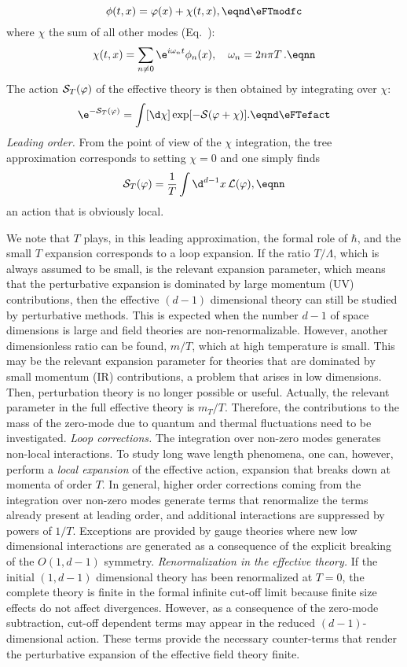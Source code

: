 $$\phi( t,x)=\varphi(x)+\chi(t,x), \eqnd\eFTmodfc $$
where  $\chi$ the
sum of all other modes (Eq.~\emodexp):
$$\chi(t,x)=\sum_{n\ne 0}\e^{i\omega_n t}\phi_n
(x), \quad \omega_n=2n\pi T\,. \eqnn $$
The action ${\cal S}_T(\varphi) $ of the effective theory is then obtained by integrating over $\chi$:
$$\e^{-{\cal S}_T(\varphi)}=\int[\d\chi]\exp[-{\cal S}
(\varphi +\chi)]. \eqnd\eFTefact $$
\smallskip
{\it Leading order.} From the point of view of the $\chi$
integration, the tree approximation corresponds to setting
$\chi=0$ and one simply finds
$${\cal S}_T(\varphi)={1\over T} \int\d^{d-1} x\,{\cal L}(\varphi),\eqnn $$
an action that is obviously local.  \par We note that $T$ plays,
in this leading approximation, the formal role of $ \hbar$, and
the small $T$ expansion corresponds to a loop expansion.
 If the ratio $T/ \Lambda$, which is always assumed to be small,
 is the relevant expansion parameter, which means that the perturbative expansion
 is dominated by large momentum (UV) contributions, then the effective $(d-1)$
dimensional theory can still be studied by perturbative methods. This is
expected when the number $d-1$ of space dimensions is large and field
theories are non-renormalizable. However, another dimensionless
ratio can be found, $m/T$, which at high temperature
is small. This may be the relevant expansion parameter for theories that
are dominated by small momentum (IR) contributions,  a problem that
arises in low dimensions. Then, perturbation theory
is no longer possible or useful.   Actually, the relevant
parameter in the full effective theory  is $m_T/T$.
Therefore, the contributions to the mass of the zero-mode due to quantum
and thermal fluctuations need to be investigated.
\smallskip
{\it Loop corrections.} The integration over non-zero modes
generates non-local interactions.  To study long wave length
phenomena, one can, however, perform  a {\it local expansion}\/ of
the effective action, expansion that breaks down at momenta of
order $T$.  In general, higher order corrections coming from the
integration over non-zero modes generate terms that renormalize
the terms already present at leading order, and additional
interactions are suppressed by powers of $1/T$.  Exceptions are
provided by gauge theories where new low dimensional interactions
are generated as a consequence of the explicit breaking of the
$O(1,d-1)$ symmetry.
\smallskip
{\it Renormalization in the effective theory.} If the initial $(1,d-1)$ dimensional theory has been
renormalized at $T=0$, the complete theory is finite in the formal infinite cut-off
limit because finite size effects do not affect divergences. However, as a consequence of the zero-mode subtraction, cut-off
dependent terms may appear in the reduced $(d-1)$-dimensional action. These terms provide the necessary counter-terms that render the perturbative expansion of the effective field theory finite.
\def\Pib{ \Pi}

